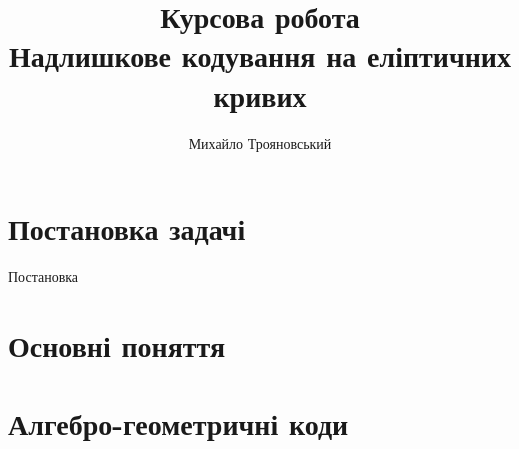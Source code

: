 \documentclass[a4paper,12pt,oneside]{article}
\title{Курсова робота\\Надлишкове кодування на еліптичних кривих}
\author{Михайло Трояновський}
\begin{document}
\maketitle
\tableofcontents
\pagebreak

\section{Постановка задачі}
Постановка

\section{Основні поняття}

\section{Алгебро-геометричні коди}

\nocite{*}

\clearpage
{}

\end{document}

